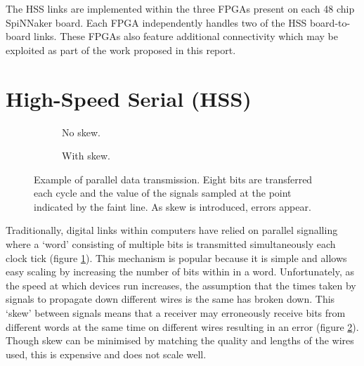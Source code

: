 			The HSS links are implemented within the three FPGAs present on each 48
			chip SpiNNaker board. Each FPGA independently handles two of the HSS
			board-to-board links. These FPGAs also feature additional connectivity
			which may be exploited as part of the work proposed in this report.
	
	\section{High-Speed Serial (HSS)}
		\label{sec:high-speed-serial}
		
		
		\begin{figure}
			\begin{subfigure}{0.48\textwidth}
				\center
				\begin{tikzpicture}[thick, node distance=0.2cm, xscale=0.40]
					
					
					
				\end{tikzpicture}
				
				\caption{No skew.}
				\label{fig:parcons-no-skew}
			\end{subfigure}
			\begin{subfigure}{0.48\textwidth}
				\center
				\begin{tikzpicture}[thick, node distance=0.2cm, xscale=0.40]
					
					
				\end{tikzpicture}
				
				\caption{With skew.}
				\label{fig:parcons-with-skew}
			\end{subfigure}
			
			\caption[Parallel signalling example.]{Example of parallel data
			transmission. Eight bits are transferred each cycle and the value of the
			signals sampled at the point indicated by the faint line. As skew is
			introduced, errors appear.}
			\label{fig:parcons} \end{figure}
		
		Traditionally, digital links within computers have relied on parallel
		signalling where a `word' consisting of multiple bits is transmitted
		simultaneously each clock tick (figure \ref{fig:parcons-no-skew}). This
		mechanism is popular because it is simple and allows easy scaling by
		increasing the number of bits within in a word. Unfortunately, as the speed
		at which devices run increases, the assumption that the times taken by
		signals to propagate down different wires is the same has broken down. This
		`skew' between signals means that a receiver may erroneously receive bits
		from different words at the same time on different wires resulting in an
		error (figure \ref{fig:parcons-with-skew}). Though skew can be minimised by
		matching the quality and lengths of the wires used, this is expensive and
		does not scale well.
		
